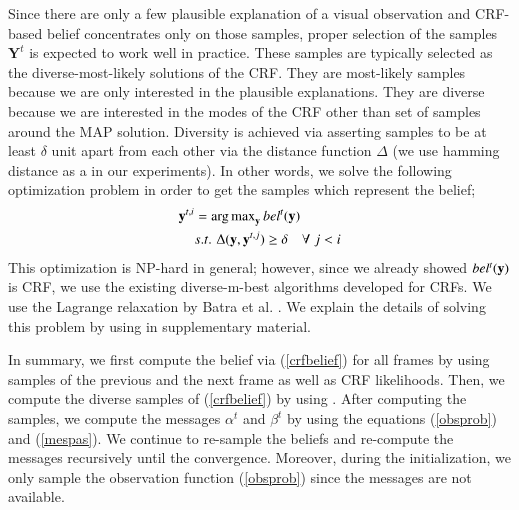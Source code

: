 Since there are only a few plausible explanation of a visual observation and CRF-based belief concentrates only on those samples, proper selection of the samples $\mathbf{Y}^t$ is expected to work well in practice. These samples are typically selected as the diverse-most-likely solutions of the CRF. They are most-likely samples because we are only interested in the plausible explanations. They are diverse because we are interested in the modes of the CRF other than set of samples around the MAP solution. Diversity is achieved via asserting samples to be at least $\delta$ unit apart from each other via the distance function $\Delta$ (we use hamming distance as a in our experiments). In other words, we solve the following optimization problem in order to get the samples which represent the belief;
\begin{equation}
\begin{aligned}
\mathbf{y}^{t,i} &= \argmax_{\mathbf{y}}  bel^t(\mathbf{y}) \\
&s.t.\,\, \Delta(\mathbf{y},\mathbf{y}^{t,j}) \geq \delta \quad \forall \; {j < i}
\end{aligned}
\label{divopt}
\end{equation}
This optimization is NP-hard in general; however, since we already showed $bel^t(\bf{y})$ is CRF, we use the existing diverse-m-best algorithms developed for CRFs. We use the Lagrange relaxation by Batra et al. \cite{divmbest}. We explain the details of solving this problem by using \cite{divmbest} in supplementary material.

In summary, we first compute the belief via (\ref{crfbelief}) for all frames by using samples of the previous and the next frame as well as CRF likelihoods. Then, we compute the diverse samples of (\ref{crfbelief}) by using \cite{divmbest}. After computing the samples, we compute the messages $\alpha^t$ and $\beta^t$ by using the equations (\ref{obsprob}) and (\ref{mespas}). We continue to re-sample the beliefs and re-compute the messages recursively until the convergence. Moreover, during the initialization, we only sample the observation function (\ref{obsprob}) since the messages are not available.
